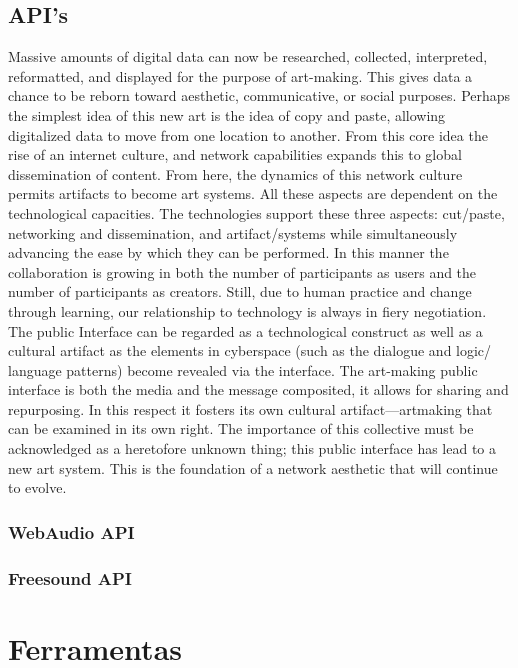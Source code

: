 \subsection{API's}
\begin{citacao}
Massive amounts of digital data can now be researched, collected, interpreted, reformatted, and displayed for the purpose of art-making. This gives data a chance to be reborn toward aesthetic, communicative, or social purposes. Perhaps the simplest idea of this new art is the idea of copy and paste, allowing digitalized data to move from one location to another. From this core idea the rise of an internet culture, and network capabilities expands this to global dissemination of content. From here, the dynamics of this network culture permits artifacts to become art systems. All these aspects are dependent on the technological capacities. The technologies support these three aspects: cut/paste, networking and dissemination, and artifact/systems while simultaneously advancing the ease by which they can be performed. In this manner the collaboration is growing in both the number of participants as users and the number of participants as creators. Still, due to human practice and change through learning, our relationship to technology is always in fiery negotiation. The public Interface can be regarded as a technological construct as well as a cultural artifact as the elements in cyberspace (such as the dialogue and logic/ language patterns) become revealed via the interface. The art-making public interface is both the media and the message composited, it allows for sharing and repurposing. In this respect it fosters its own cultural artifact—artmaking that can be examined in its own right. The importance of this collective must be acknowledged as a heretofore unknown thing; this public interface has lead to a new art system. This is the foundation of a network aesthetic that will continue to evolve.
\cite[5]{Soon2011}
\end{citacao}

\subsubsection{WebAudio API}

\subsubsection{Freesound API}

\section{Ferramentas}
